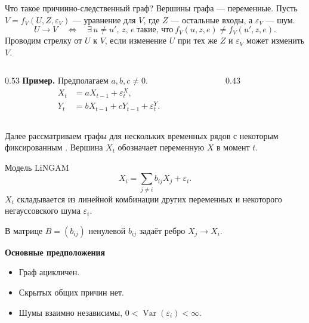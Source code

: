 \documentclass[aspectratio=169]{beamer}
\newcommand{\lead}[1]{{\usebeamercolor[fg]{block title}\textbf{#1}}}
\begin{document}
\begin{frame}[t]{Что такое причинно-следственный граф?}
    Вершины графа --- переменные. Пусть $V=f_V(U,Z,\varepsilon_V)$
    --- уравнение для $V$, где $Z$ --- остальные входы, а $\varepsilon_V$ --- шум.
    \[
        \boxed{
            U\to V
            \quad\Longleftrightarrow\quad
            \exists\,u\ne u',\,z,\,e\ \text{такие, что}\
            f_V(u,z,e)\ne f_V(u',z,e).
        }
    \]
    Проводим стрелку от $U$ к $V$, если изменение $U$ при тех же
    $Z$ и $\varepsilon_V$ может изменить $V$.

    \medskip
    \begin{columns}[c,onlytextwidth]
        \begin{column}{0.53\textwidth}
            \lead{Пример.} Предполагаем $a,b,c\ne0$.
            \[
                \begin{aligned}
                    X_t &= aX_{t-1}+\varepsilon_t^X,\\
                    Y_t &= bX_{t-1}+cY_{t-1}+\varepsilon_t^Y.
                \end{aligned}
            \]
        \end{column}
        \begin{column}{0.43\textwidth}
            \centering
        \end{column}
    \end{columns}

    \par\vfill
    \small Далее рассматриваем графы для нескольких временных рядов с некоторым фиксированным .
    Вершина $X_t$ обозначает переменную $X$ в момент $t$.
\end{frame}

\begin{frame}{Модель LiNGAM}
    \[
        X_i=\sum_{j\ne i} b_{ij}X_j+\varepsilon_i.
    \]
    $X_i$ складывается из линейной комбинации других переменных
    и некоторого негауссовского шума $\varepsilon_i$.
    \par\smallskip
    В матрице $B=(b_{ij})$ ненулевой $b_{ij}$ задаёт ребро $X_j\to X_i$.
    \par\medskip
    \lead{Основные предположения}
    \begin{itemize}
        \item Граф ацикличен.
        \item Скрытых общих причин нет.
        \item Шумы взаимно независимы, $0<\operatorname{Var}(\varepsilon_i)<\infty$.
    \end{itemize}
\end{frame}
\end{document}
